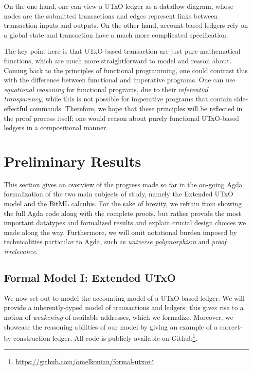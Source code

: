 \documentclass[acmsmall,nonacm=true,screen=true]{acmart}
\newcommand\site[1]{\footnote{\url{#1}}}
\begin{document}
On the one hand, one can view a UTxO ledger as a dataflow diagram, whose nodes are the submitted transactions
and edges represent links between transaction inputs and outputs.
On the other hand, account-based ledgers rely on a global state and transaction have a much more complicated
specification.

The key point here is that UTxO-based transaction are just pure mathematical functions, which are much more
straightforward to model and reason about.
Coming back to the principles of functional programming, one could contrast this with the difference between
functional and imperative programs.
One can use \textit{equational reasoning} for functional programs, due to their \textit{referential transparency},
while this is not possible for imperative programs that contain side-effectful commands.
Therefore, we hope that these principles will be reflected in the proof process itself;
one would reason about purely functional UTxO-based ledgers in a compositional manner.


\section{Preliminary Results}
\label{sec:results}
This section gives an overview of the progress made so far in the on-going Agda formalization of the two main subjects of study,
namely the Extended UTxO model and the BitML calculus.
For the sake of brevity, we refrain from showing the full Agda code along with the complete proofs, but rather
provide the most important datatypes and formalized results and explain crucial design choices we made along the way.
Furthermore, we will omit notational burden imposed by technicalities particular to Agda, such as \textit{universe polymorphism}
and \textit{proof irrelevance}.

\subsection{Formal Model I: Extended UTxO} \label{subsec:eutxo}
We now set out to model the accounting model of a UTxO-based ledger.
We will provide a inherently-typed model of transactions and ledgers;
this gives rise to a notion of \textit{weakening} of available addresses, which we formalize.
Moreover, we showcase the reasoning abilities of our model by giving
an example of a correct-by-construction ledger.
All code is publicly available on Github\site{https://github.com/omelkonian/formal-utxo}.
\end{document}
